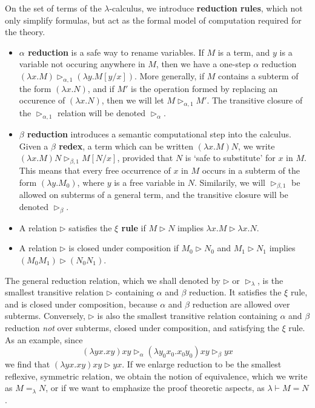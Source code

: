 On the set of terms of the $\lambda$-calculus, we introduce {\bf reduction rules}, which not only simplify formulas, but act as the formal model of computation required for the theory.
%
\begin{itemize}
    \item {\bf $\alpha$ reduction} is a safe way to rename variables. If $M$ is a term, and $y$ is a variable not occuring anywhere in $M$, then we have a one-step $\alpha$ reduction $(\lambda x.M) \rhd_{\alpha,1} (\lambda y.M[y/x])$. More generally, if $M$ contains a subterm of the form $(\lambda x.N)$, and if $M'$ is the operation formed by replacing an occurence of $(\lambda x.N)$, then we will let $M \rhd_{\alpha,1} M'$. The transitive closure of the $\rhd_{\alpha,1}$ relation will be denoted $\rhd_\alpha$.

    \item {\bf $\beta$ reduction} introduces a semantic computational step into the calculus. Given a {\bf $\beta$ redex}, a term which can be written $(\lambda x.M)N$, we write $(\lambda x.M)N \rhd_{\beta,1} M[N/x]$, provided that $N$ is `safe to substitute' for $x$ in $M$. This means that every free occurrence of $x$ in $M$ occurs in a subterm of the form $(\lambda y.M_0)$, where $y$ is a free variable in $N$. Similarily, we will $\rhd_{\beta,1}$ be allowed on subterms of a general term, and the transitive closure will be denoted $\rhd_\beta$.

    \item A relation $\rhd$ satisfies the {\bf $\xi$ rule} if $M \rhd N$ implies $\lambda x.M \rhd \lambda x.N$.

    \item A relation $\rhd$ is closed under composition if $M_0 \rhd N_0$ and $M_1 \rhd N_1$ implies $(M_0 M_1) \rhd (N_0 N_1)$.
\end{itemize}
%
The general reduction relation, which we shall denoted by $\rhd$ or $\rhd_{\lambda}$, is the smallest transitive relation $\rhd$ containing $\alpha$ and $\beta$ reduction. It satisfies the $\xi$ rule, and is closed under composition, because $\alpha$ and $\beta$ reduction are allowed over subterms. Conversely, $\rhd$ is also the smallest transitive relation containing $\alpha$ and $\beta$ reduction {\it not} over subterms, closed under composition, and satisfying the $\xi$ rule. As an example, since
%
\[ (\lambda yx.xy)xy \rhd_\alpha (\lambda y_0x_0.x_0y_0)xy \rhd_\beta yx \]
%
we find that $(\lambda yx.xy)xy \rhd yx$. If we enlarge reduction to be the smallest reflexive, symmetric relation, we obtain the notion of equivalence, which we write as $M =_\lambda N$, or if we want to emphasize the proof theoretic aspects, as $\lambda \vdash M = N$.

